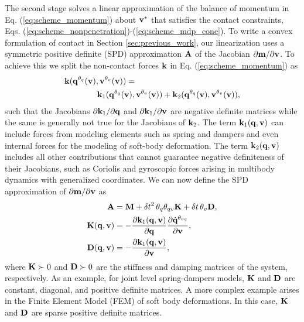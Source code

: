 The second stage solves a linear approximation of the balance of momentum in Eq.
(\ref{eq:scheme_momentum}) about ${\mathbf{v}}^*$ that satisfies the contact
constraints, Eqs. (\ref{eq:scheme_nonpenetration})-(\ref{eq:scheme_mdp_cone}). To write
a convex formulation of contact in Section \ref{sec:previous_work}, our
linearization uses a symmetric positive definite (SPD) approximation ${\mathbf{A}}$ of
the Jacobian $\partial {\mathbf{m}}/\partial {\mathbf{v}}$. To achieve this we split the
non-contact forces ${\mathbf{k}}$ in Eq. (\ref{eq:scheme_momentum}) as
\begin{align*}
	&{\mathbf{k}}({\mathbf{q}}^{\theta_{q}}({\mathbf{v}}), {\mathbf{v}}^{\theta_v}({\mathbf{v}})) = \\
    &\qquad\qquad {\mathbf{k}}_1({\mathbf{q}}^{\theta_{q}}({\mathbf{v}}), {\mathbf{v}}^{\theta_v}({\mathbf{v}}))+
	{\mathbf{k}}_2({\mathbf{q}}^{\theta_{q}}({\mathbf{v}}), {\mathbf{v}}^{\theta_v}({\mathbf{v}})),
\end{align*}
such that the Jacobians $\partial {\mathbf{k}}_1/\partial{\mathbf{q}}$ and $\partial
{\mathbf{k}}_1/\partial{\mathbf{v}}$ are negative definite matrices while the same is
generally not true for the Jacobians of ${\mathbf{k}}_2$. The term ${\mathbf{k}}_1({\mathbf{q}},
{\mathbf{v}})$ can include forces from modeling elements such as spring and dampers
and even internal forces for the modeling of soft-body deformation. The term
${\mathbf{k}}_2({\mathbf{q}}, {\mathbf{v}})$ includes all other contributions that cannot
guarantee negative definiteness of their Jacobians, such as Coriolis and
gyroscopic forces arising in multibody dynamics with generalized coordinates. We
can now define the SPD approximation of $\partial {\mathbf{m}}/\partial {\mathbf{v}}$ as
\begin{align}
	\mf{A}&=\mf{M}+\delta t^2\,\theta_q\theta_{qv}\mf{K}+\delta t\,\theta_v\mf{D},
	\label{eq:expression_for_A}\\
	\mf{K}(\mf{q}, \mf{v})&=-\frac{\partial \mf{k}_1(\mf{q}, \mf{v})}{\partial
	\mf{q}}\frac{\partial\dot{\mf{q}}^{\theta_{vq}}}{\partial\mf{v}},
	\label{eq:stiffness_matrix}\\
	\mf{D}(\mf{q}, \mf{v})&=-\frac{\partial \mf{k}_1(\mf{q}, \mf{v})}{\partial
	\mf{v}},
	\label{eq:dissipation_matrix}
\end{align}
where ${\mathbf{K}} \succ 0$ and ${\mathbf{D}}\succ 0$ are the stiffness and damping
matrices of the system, respectively. As an example, for joint level
spring-dampers models, ${\mathbf{K}}$ and ${\mathbf{D}}$ are constant, diagonal, and
positive definite matrices. A more complex example arises in the Finite Element
Model (FEM) of soft body deformations. In this case, ${\mathbf{K}}$ and ${\mathbf{D}}$ are
sparse positive definite matrices.

